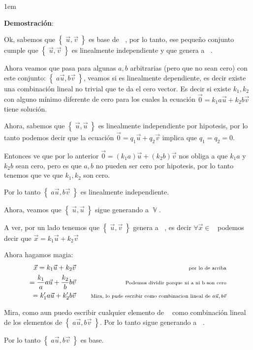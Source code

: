 \documentclass[12pt, fleqn]{article}                             %
\newenvironment{SmallIndentation}[1][0.75em]                    %
        {\begin{adjustwidth}{#1}{}\begin{footnotesize}}             %
        {\end{footnotesize}\end{adjustwidth}}                       %
\DeclareMathOperator \Space {\quad}                             %
\newcommand \Remember[1]{\Space\text{\scriptsize{#1}}}          %
\theoremstyle{break}                                            %
\DeclareMathOperator \GenericField {\mathbb{F}}                 %
\DeclareMathOperator \VectorSet    {\mathbb{V}}                 %
\DeclareMathOperator \VectorSpace  {\VectorSet_{\GenericField}} %
\newcommand{\Set}[1]    {\left\{ \; #1 \; \right\}}             %
\begin{document}
    \begin{SmallIndentation}[1em]
        \textbf{Demostración}:
        
        Ok, sabemos que $\Set{ \vec u, \vec v}$ es base de $\VectorSpace$, por lo tanto, ese pequeño conjunto
        cumple que $\Set{ \vec u, \vec v}$ es linealmente independiente y que genera a $\VectorSpace$.

        Ahora veamos que pasa para algunas $a, b$ arbitrarias (pero que no sean cero) con este conjunto: 
        $\Set{a \vec u, b \vec v}$, veamos si es linealmente dependiente, es decir existe una combinación lineal
        no trivial que te da el cero vector.
        Es decir si existe $k_1, k_2$ con alguno mínimo diferente de cero para los cuales la ecuación 
        $\vec 0 = k_1 a \vec u + k_2 b \vec v$  tiene solución.

        Ahora, sabemos que $\Set{\vec u, \vec u}$ es linealmente independiente por hipotesis, por lo tanto
        podemos decir que la ecuación $\vec 0 = q_1 \vec u + q_2 \vec v$ implica que $q_1 = q_2 = 0$.

        Entonces ve que por lo anterior $\vec 0 = (k_1 a) \vec u + (k_2 b) \vec v$ nos obliga a que $k_1a$ y $k_2b$ 
        sean cero, pero es que $a, b$ no pueden ser cero por hipotesis, por lo tanto tenemos que ve que $k_1, k_2$ son cero.

        Por lo tanto $\Set{a \vec u, b \vec v}$ es linealmente independiente.

        Ahora, veamos que $\Set{\vec u, \vec u}$ sigue generando a $\VectorSet$.

        A ver, por un lado tenemos que $\Set{\vec u, \vec v}$ genera a $\VectorSpace$, es decir
        $\forall \vec x \in \VectorSpace$ podemos decir que $\vec x = k_1 \vec u + k_2 \vec v$

        Ahora hagamos magia:
        \begin{align*}
            \vec x  
                = k_1 \vec u + k_2 \vec v  
                    &&\Remember{ por lo de arriba}                                                      \\
                = \frac{k_1}{a} a \vec u + \frac{k_2}{b} b\vec v
                    &&\Remember{Podemos dividir porque ni a ni b son cero}                              \\
                = k_1' a \vec u + k_2' b\vec v
                    &&\Remember{Mira, lo pude escribir como combinacion lineal de $a\vec u, b \vec v$}   
        \end{align*}

        Mira, como aun puedo escribir cualquier elemento de $\VectorSpace$ como combinación lineal de los
        elementos de $\Set{a \vec u, b \vec v}$. Por lo tanto sigue generando a $\VectorSpace$.

        Por lo tanto $\Set{a \vec u, b \vec v}$ es base. 
    
    \end{SmallIndentation}
\end{document}
